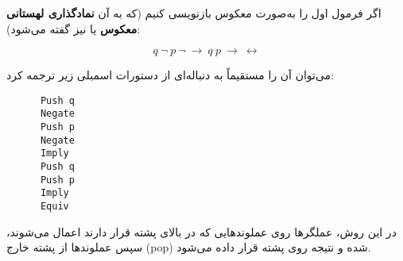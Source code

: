     اگر فرمول اول را به‌صورت معکوس بازنویسی کنیم (که به آن \textbf{نمادگذاری لهستانی معکوس} یا  نیز گفته می‌شود):
 
    \[
    q\ \neg\ p\ \neg\ \rightarrow\ q\ p\ \rightarrow\ \leftrightarrow
    \]
 
    می‌توان آن را مستقیماً به دنباله‌ای از دستورات اسمبلی زیر ترجمه کرد:
 
    \begin{latin}
      \begin{verbatim}
      Push q
      Negate
      Push p
      Negate
      Imply
      Push q
      Push p
      Imply
      Equiv
      \end{verbatim}
    \end{latin}
 
    در این روش، عملگرها روی عملوندهایی که در بالای پشته قرار دارند اعمال می‌شوند، سپس عملوندها از پشته خارج (pop) شده و نتیجه روی پشته قرار داده می‌شود.